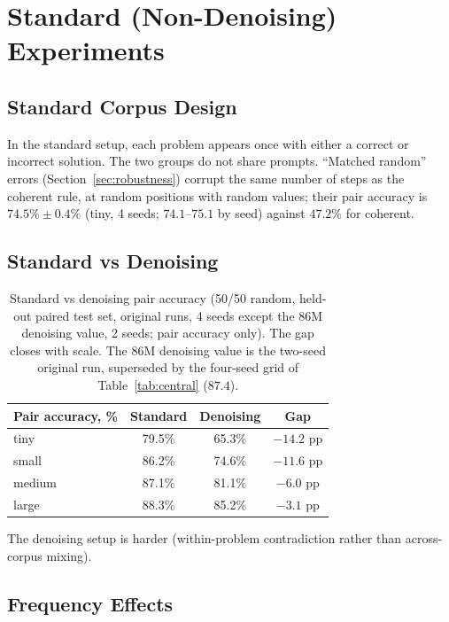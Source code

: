 \documentclass{article}
\begin{document}
\section{Standard (Non-Denoising) Experiments}
\label{app:standard}

\subsection{Standard Corpus Design}

In the standard setup, each problem appears once with either a correct or incorrect solution. The two groups do not share prompts. ``Matched random'' errors (Section~\ref{sec:robustness}) corrupt the same number of steps as the coherent rule, at random positions with random values; their pair accuracy is $74.5\% \pm 0.4\%$ (tiny, 4 seeds; $74.1$--$75.1$ by seed) against $47.2\%$ for coherent.

\subsection{Standard vs Denoising}

\begin{table}[ht]
\centering
\small
\begin{tabular}{lccc}
\toprule
Pair accuracy, \% & Standard & Denoising & Gap \\
\midrule
tiny   & 79.5\% & 65.3\% & $-14.2$ pp \\
small  & 86.2\% & 74.6\% & $-11.6$ pp \\
medium & 87.1\% & 81.1\% & $-6.0$ pp \\
large  & 88.3\% & 85.2\% & $-3.1$ pp \\
\bottomrule
\end{tabular}
\caption{Standard vs denoising pair accuracy (50/50 random, held-out paired test set, original runs, 4 seeds except the 86M denoising value, 2 seeds; pair accuracy only). The gap closes with scale. The 86M denoising value is the two-seed original run, superseded by the four-seed grid of Table~\ref{tab:central} ($87.4$).}
\label{tab:standard_vs_denoising}
\end{table}

The denoising setup is harder (within-problem contradiction rather than across-corpus mixing).

\subsection{Frequency Effects}
\end{document}
